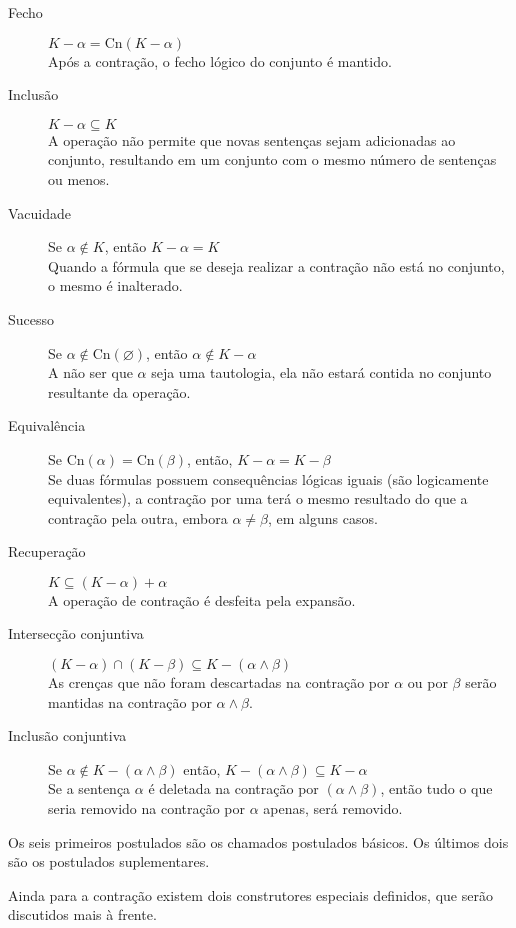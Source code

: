 \begin{description}
	\item[Fecho] $ K - \alpha = \text{Cn}(K - \alpha) $ \\ Após a contração, o fecho lógico do conjunto é mantido.
	\item[Inclusão] $ K - \alpha \subseteq K$ \\ A operação não permite que novas sentenças sejam adicionadas ao conjunto, resultando em um conjunto com o mesmo número de sentenças ou menos.
	\item[Vacuidade] Se $ \alpha \notin K $, então $ K - \alpha = K $ \\ Quando a fórmula que se deseja realizar a contração não está no conjunto, o mesmo é inalterado.
	\item[Sucesso] Se $ \alpha \notin \text{Cn}(\varnothing) $, então $ \alpha \notin K - \alpha $ \\ A não ser que $ \alpha $ seja uma tautologia, ela não estará contida no conjunto resultante da operação.
	\item[Equivalência] Se $ \text{Cn}(\alpha) = \text{Cn}(\beta) $, então, $ K - \alpha = K - \beta $ \\ Se duas fórmulas possuem consequências lógicas iguais (são logicamente equivalentes), a contração por uma terá o mesmo resultado do que a contração pela outra, embora $ \alpha \neq \beta $, em alguns casos.
	\item[Recuperação] $ K \subseteq (K - \alpha) + \alpha $ \\ A operação de contração é desfeita pela expansão.
	\item[Intersecção conjuntiva] $ (K - \alpha) \cap (K - \beta) \subseteq K - (\alpha \land \beta) $ \\ As crenças que não foram descartadas na contração por $ \alpha $ ou por $ \beta $ serão mantidas na contração por $ \alpha \land \beta $.
	\item[Inclusão conjuntiva] Se $ \alpha \notin K - (\alpha \land \beta) $ então, $ K - (\alpha \land \beta) \subseteq K - \alpha $ \\ Se a sentença $ \alpha $ é deletada na contração por $  (\alpha \land \beta) $, então tudo o que seria removido na contração por $ \alpha $ apenas, será removido. 
\end{description}

Os seis primeiros postulados são os chamados postulados básicos. Os últimos dois são os postulados suplementares.

Ainda para a contração existem dois construtores especiais definidos, que serão discutidos mais à frente.

